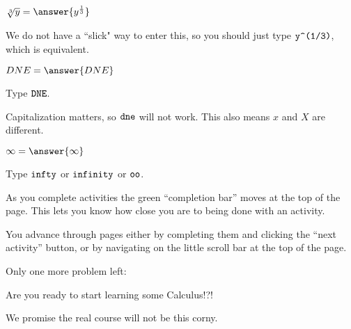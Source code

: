 \documentclass{ximera}
\begin{document}
\begin{problem}
  $\sqrt[3]{y} = \answer{y^{\frac{1}{3}}}$
  \begin{hint}
    We do not have a ``slick" way to enter this, so you should just
    type $\verb!y^(1/3)!$, which is equivalent.
  \end{hint}
\end{problem}


\begin{problem}
  $DNE = \answer{DNE}$
  \begin{hint}
    Type $\verb|DNE|$.
  \end{hint}
  \begin{feedback}
    Capitalization matters, so $\verb!dne!$ will not work.  This also
    means $x$ and $X$ are different.
  \end{feedback}
\end{problem}

\begin{problem}
  $\infty = \answer{\infty}$
  \begin{hint}
    Type $\verb|infty|$ or $\verb|infinity|$ or $\verb|oo|$.
  \end{hint}
\end{problem}

As you complete activities the green ``completion bar'' moves at the
top of the page.  This lets you know how close you are to being done
with an activity.

You advance through pages either by completing them and clicking the
``next activity'' button, or by navigating on the little scroll bar at
the top of the page.
 
Only one more problem left:
\begin{problem}
  Are you ready to start learning some Calculus!?!
  \begin{multipleChoice}
  \end{multipleChoice}
  \begin{hint}
    We promise the real course will not be this corny.
  \end{hint}
\end{problem}
\end{document}
